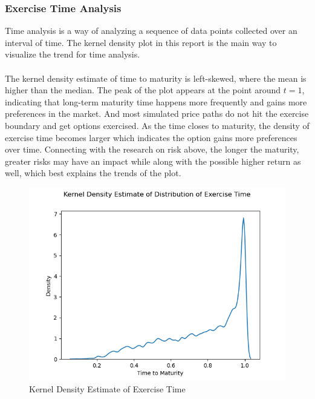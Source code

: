\documentclass[12pt]{article}
\begin{document}
\subsubsection{Exercise Time Analysis}
Time analysis is a way of analyzing a sequence of data points collected over an interval of time. The kernel density plot in this report is the main way to visualize the trend for time analysis.
\\\\
The kernel density estimate of time to maturity is left-skewed, where the mean is higher than the median. The peak of the plot appears at the point around $t=1$, indicating that long-term maturity 
time happens more frequently and gains more preferences in the market. And most simulated price paths do not hit the exercise boundary and get options exercised.
As the time closes to maturity, the density of exercise time becomes larger which indicates the option gains more preferences over time. 
Connecting with the research on risk above, the longer the maturity, greater risks may have an impact while along with the possible higher return as well, which best explains the trends of the plot.


\begin{figure}[H]
  \centering
    \includegraphics[scale=0.63]{3b-i-exercise_t.png}
    \caption[Kernel Density Estimate of Exercise Time]{Kernel Density Estimate of Exercise Time}
\end{figure}
\end{document}
